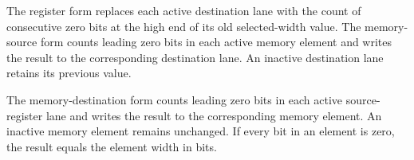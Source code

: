 The register form replaces each active destination lane with the count of
consecutive zero bits at the high end of its old selected-width value. The
memory-source form counts leading zero bits in each active memory element and
writes the result to the corresponding destination lane. An inactive destination
lane retains its previous value.

The memory-destination form counts leading zero bits in each active
source-register lane and writes the result to the corresponding memory element.
An inactive memory element remains unchanged. If every bit in an element is zero,
the result equals the element width in bits.
